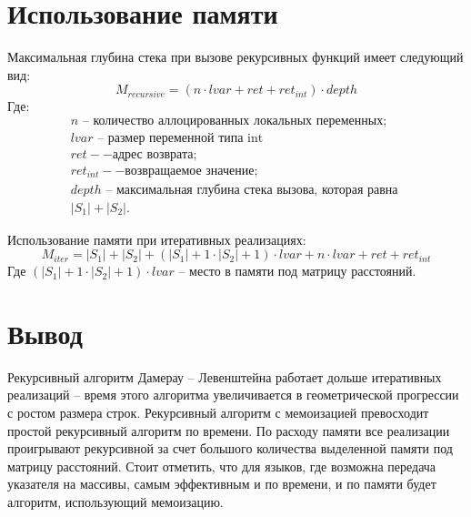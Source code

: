 \section{Использование памяти}

Максимальная глубина стека при вызове рекурсивных функций имеет следующий вид:
\begin{equation}\label{rec-mem}
	M_{recursive} = (n \cdot lvar + ret + ret_{int}) \cdot depth
\end{equation}
Где:
\[
\begin{array}{l}
	n\text{ -- количество аллоцированных локальных переменных}; \\
	lvar\text{ -- размер переменной типа int} \\
	ret -- \text{адрес возврата;}\\
	ret_{int} -- \text{возвращаемое значение;}\\
	depth\text{ --  максимальная глубина стека вызова, которая равна } \\
	|S_1| + |S_2|.
\end{array}
\]

Использование памяти при итеративных реализациях: 
\begin{equation}
	M_{iter} = |S_1| + |S_2| + (|S_1| + 1 \cdot |S_2| + 1) \cdot lvar + n \cdot lvar + ret + ret_{int}
\end{equation}
Где $(|S_1| + 1 \cdot |S_2| + 1) \cdot lvar$ -- место в памяти под матрицу расстояний.

\section{Вывод}
Рекурсивный алгоритм  Дамерау -- Левенштейна работает дольше итеративных реализаций -- время этого алгоритма увеличивается в геометрической прогрессии с ростом размера строк.
Рекурсивный алгоритм с мемоизацией превосходит простой рекурсивный алгоритм по времени. 
По расходу памяти все реализации проигрывают рекурсивной за счет большого количества выделенной памяти под матрицу расстояний.
Стоит отметить, что для языков, где возможна передача указателя на массивы, самым эффективным и по времени, и по памяти будет алгоритм, использующий мемоизацию.
